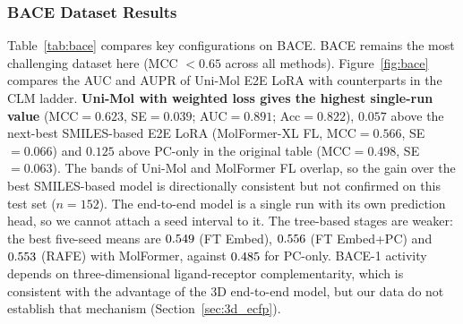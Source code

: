\documentclass[pdflatex,sn-mathphys-num]{sn-jnl}%
\begin{document}
\begin{table}[t]
\centering
\caption{Best performing configurations on Flavor. Prec/Rec are macro-averaged; AUC is one-vs-rest macro ROC AUC.}
\label{tab:flavor}
\end{table}

\subsubsection{BACE Dataset Results}
Table~\ref{tab:bace} compares key configurations on BACE. BACE remains the most challenging dataset here (MCC $< 0.65$ across all methods). Figure~\ref{fig:bace} compares the AUC and AUPR of Uni-Mol E2E LoRA with counterparts in the CLM ladder. \textbf{Uni-Mol with weighted loss gives the highest single-run value} (MCC$=0.623$, SE$=0.039$; AUC$=0.891$; Acc$=0.822$), $0.057$ above the next-best SMILES-based E2E LoRA (MolFormer-XL FL, MCC$=0.566$, SE$=0.066$) and $0.125$ above PC-only in the original table (MCC$=0.498$, SE$=0.063$). The bands of Uni-Mol and MolFormer FL overlap, so the gain over the best SMILES-based model is directionally consistent but not confirmed on this test set ($n=152$). The end-to-end model is a single run with its own prediction head, so we cannot attach a seed interval to it. The tree-based stages are weaker: the best five-seed means are $0.549$ (FT Embed), $0.556$ (FT Embed+PC) and $0.553$ (RAFE) with MolFormer, against $0.485$ for PC-only. BACE-1 activity depends on three-dimensional ligand-receptor complementarity, which is consistent with the advantage of the 3D end-to-end model, but our data do not establish that mechanism (Section~\ref{sec:3d_ecfp}).
\end{document}
